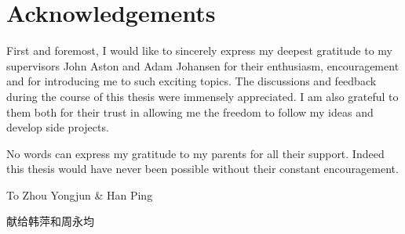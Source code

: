 \chapter*{Acknowledgements}

First and foremost, I would like to sincerely express my deepest gratitude to
my supervisors John Aston and Adam Johansen for their enthusiasm,
encouragement and for introducing me to such exciting topics. The discussions
and feedback during the course of this thesis were immensely appreciated. I
am also grateful to them both for their trust in allowing me the freedom to
follow my ideas and develop side projects.

No words can express my gratitude to my parents for all their support. Indeed
this thesis would have never been possible without their constant
encouragement.

\baselineskip
\begin{center}
  \Large To Zhou Yongjun \& Han Ping
\end{center}
\begin{center}
  \Large 献给韩萍和周永均
\end{center}
